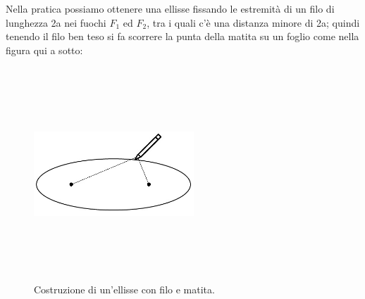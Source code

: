 Nella pratica possiamo ottenere una ellisse fissando le estremità di 
un filo di lunghezza 2a nei fuochi $ F_{1} $ ed $ F_{2} $, tra i quali c'è 
una distanza minore di 2a; quindi tenendo il filo ben teso si fa scorrere 
la punta della matita su un foglio come nella figura qui a sotto:
\begin{figure}[h]
  \centering%
  \includegraphics[height=8cm, width=6cm, keepaspectratio] {img/matita.jpg}%
  \caption{Costruzione di un'ellisse con filo e matita.}%
\end{figure}

